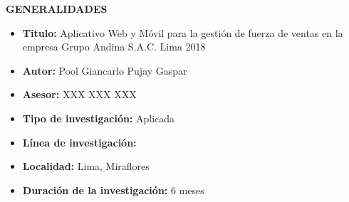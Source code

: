 \newpage

\textbf{ \large GENERALIDADES}
\begin{itemize}
\item { \large \textbf {Titulo:} Aplicativo Web y Móvil para la gestión de fuerza de ventas en la empresa Grupo Andina S.A.C. Lima 2018}
\item { \large \textbf {Autor:} Pool Giancarlo Pujay Gaspar}
\item { \large \textbf {Asesor:} XXX XXX XXX}

\item { \large \textbf {Tipo de investigación:}  Aplicada}
\item { \large \textbf {Línea de investigación:}  }
\item { \large \textbf {Localidad:} Lima, Miraflores}
\item { \large \textbf {Duración de la investigación:} 6 meses}


\end{itemize}
